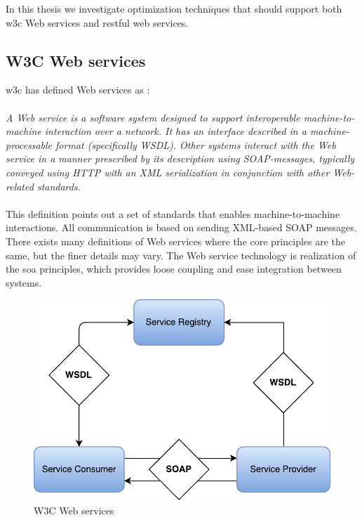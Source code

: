 In this thesis we investigate optimization techniques that should support both
\gls{w3c} Web services and \gls{rest}ful web services.

\subsection{W3C Web services}

\gls{w3c} has defined Web services as \cite{wrc-web-service}:

\paragraph{}
\textit{
    A Web service is a software system designed to support interoperable
    machine-to-machine interaction over a network. It has an interface described in
    a machine-processable format (specifically WSDL). Other systems interact with
    the Web service in a manner prescribed by its description using SOAP-messages,
    typically conveyed using HTTP with an XML serialization in conjunction with
    other Web-related standards.
}

\paragraph{}

This definition points out a set of standards that enables machine-to-machine
interactions. All communication is based on sending XML-based SOAP messages.
There exists many definitions of Web services where the core principles are the
same, but the finer details may vary. The Web service technology is realization
of the \gls{soa} principles, which provides loose coupling and ease integration
between systems.

\begin{figure}[h]
\centering
\includegraphics[scale=0.6]{images/web_services.pdf}
\caption{W3C Web services}
\label{figure-w3c-web-services}
\end{figure}

